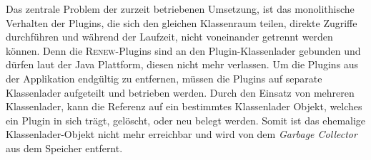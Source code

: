 	Das zentrale Problem der zurzeit betriebenen Umsetzung, ist das monolithische Verhalten der Plugins, die sich den gleichen Klassenraum teilen, direkte Zugriffe durchführen und während der Laufzeit, nicht voneinander getrennt werden können. Denn die \textsc{Renew}-Plugins sind an den Plugin-Klassenlader gebunden und dürfen laut der Java Plattform, diesen nicht mehr verlassen. \newline
	Um die Plugins aus der Applikation endgültig zu entfernen, müssen die Plugins auf separate Klassenlader aufgeteilt und betrieben werden. Durch den Einsatz von mehreren Klassenlader, kann die Referenz auf ein bestimmtes Klassenlader Objekt, welches ein Plugin in sich trägt, gelöscht, oder neu belegt werden. Somit ist das ehemalige Klassenlader-Objekt nicht mehr erreichbar und wird von dem \textit{Garbage Collector} aus dem Speicher entfernt.\bigbreak 

